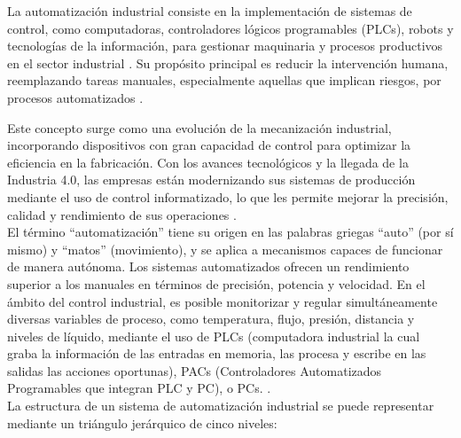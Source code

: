La automatización industrial consiste en la implementación de sistemas de control, como computadoras, controladores lógicos programables (PLCs), robots y tecnologías de la información, para gestionar maquinaria y procesos productivos en el sector industrial \cite{definicion}. Su propósito principal es reducir la intervención humana, reemplazando tareas manuales, especialmente aquellas que implican riesgos, por procesos automatizados .

Este concepto surge como una evolución de la mecanización industrial, incorporando dispositivos con gran capacidad de control para optimizar la eficiencia en la fabricación. Con los avances tecnológicos y la llegada de la Industria 4.0, las empresas están modernizando sus sistemas de producción mediante el uso de control informatizado, lo que les permite mejorar la precisión, calidad y rendimiento de sus operaciones \cite{definicion}. \\

El término ``automatización'' tiene su origen en las palabras griegas ``auto'' (por sí mismo) y ``matos'' (movimiento), y se aplica a mecanismos capaces de funcionar de manera autónoma. Los sistemas automatizados ofrecen un rendimiento superior a los manuales en términos de precisión, potencia y velocidad. En el ámbito del control industrial, es posible monitorizar y regular simultáneamente diversas variables de proceso, como temperatura, flujo, presión, distancia y niveles de líquido, mediante el uso de PLCs (computadora industrial la cual graba la información de las entradas en memoria, las procesa y escribe en las salidas las acciones oportunas), PACs (Controladores Automatizados Programables que integran PLC y PC), o PCs. \cite{definicion}. \\

La estructura de un sistema de automatización industrial se puede representar mediante un triángulo jerárquico de cinco niveles:

